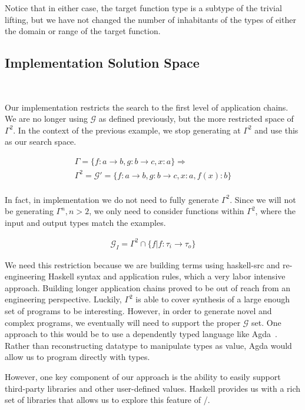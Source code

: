 Notice that in either case, the target function type is a subtype of the trivial lifting, but we have not changed the number of inhabitants of the types of either the domain or range of the target function.

\subsection{Implementation Solution Space}\label{solnSpace}\

Our implementation restricts the search to the first level of application chains.
We are no longer using $\mathcal{G}$ as defined previously, but the more restricted space of $\Gamma^2$.
In the context of the previous example, we stop generating at $\Gamma^2$ and use this as our search space.

\begin{gather*}
\Gamma = \{f:a\to b, g:b\to c, x:a\} \Rightarrow \\
\Gamma^2 = \mathcal{G}' = \{f:a\to b, g:b\to c, x:a, f(x):b\}\\
\end{gather*}

In fact, in implementation we do not need to fully generate $\Gamma^2$.
Since we will not be generating $\Gamma^n, n>2$, we only need to consider functions within $\Gamma^2$, where the input and output types match the examples.

\begin{gather*}
\mathcal{G}_I = \Gamma^2 \cap \{f | f : \tau_i \to \tau_o\}
\end{gather*}

We need this restriction because we are building terms using haskell-src and re-engineering Haskell syntax and application rules, which a very labor intensive approach.
Building longer application chains proved to be out of reach from an engineering perspective.
Luckily, $\Gamma^2$ is able to cover synthesis of a large enough set of programs to be interesting.
However, in order to generate novel and complex programs, we eventually will need to support the proper $\mathcal{G}$ set.
One approach to this would be to use a dependently typed language like Agda~\cite{}.
Rather than reconstructing datatype to manipulate types as value, Agda would allow us to program directly with types.

However, one key component of our approach is the ability to easily support third-party libraries and other user-defined values.
Haskell provides us with a rich set of libraries that allows us to explore this feature of \ourTool/.

